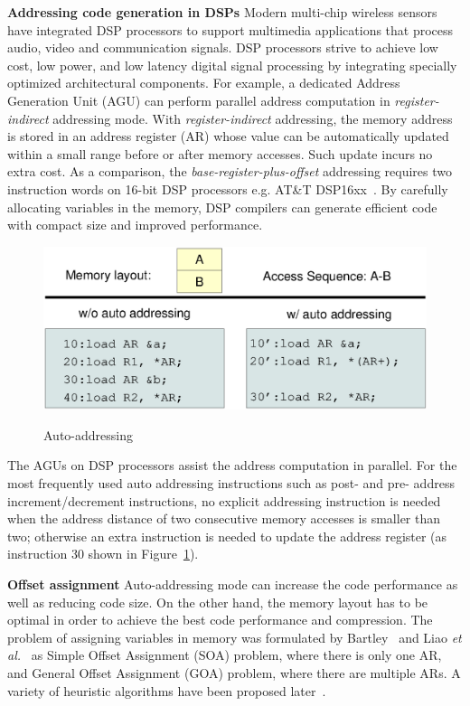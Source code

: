 \textbf{Addressing code generation in DSPs}
Modern multi-chip wireless sensors have integrated DSP processors to support multimedia applications that process audio, video and communication signals. DSP processors strive to achieve low cost, low power, and low latency digital signal processing by integrating specially optimized architectural components. For example, a dedicated Address Generation Unit (AGU) can perform parallel address computation in {\em register-indirect} addressing mode. With {\em register-indirect} addressing, the memory address is stored in an address register (AR) whose value can be automatically updated within a small range before or after memory accesses. Such update incurs no extra cost. As a comparison, the {\em base-register-plus-offset} addressing requires two instruction words on 16-bit DSP processors e.g. AT\&T DSP16xx~\cite{related:dsp}. By carefully allocating variables in the memory, DSP compilers can generate efficient code with compact size and improved performance.


\begin{figure}[htbp]
	\centering
		\includegraphics[scale=0.45]{figures/agu.eps}
	\label{fig:agu}
	\caption{Auto-addressing}
\end{figure}

The AGUs on DSP processors assist the address computation in parallel. For the most frequently used auto addressing instructions such as post- and pre- address increment/decrement instructions, no explicit addressing instruction is needed when the address distance of two consecutive memory accesses is smaller than two; otherwise an extra instruction is needed to update the address register (as instruction 30 shown in Figure~\ref{fig:agu}).

\textbf{Offset assignment}
Auto-addressing mode can increase the code performance as well as reducing code size. On the other hand, the memory layout has to be optimal in order to achieve the best code performance and compression. The problem of assigning variables in memory was formulated by Bartley~\cite{related:bartley} and Liao \textit{et al.}~\cite{related:liao} as Simple Offset Assignment (SOA) problem, where there is only one AR, and General Offset Assignment (GOA) problem, where there are multiple ARs. A variety of heuristic algorithms have been proposed later~\cite{related:atri,related:choi,related:leupers-1996,related:leupers-1998,related:ottoni,related:rao,related:sudarsanam,related:zhuang}.


